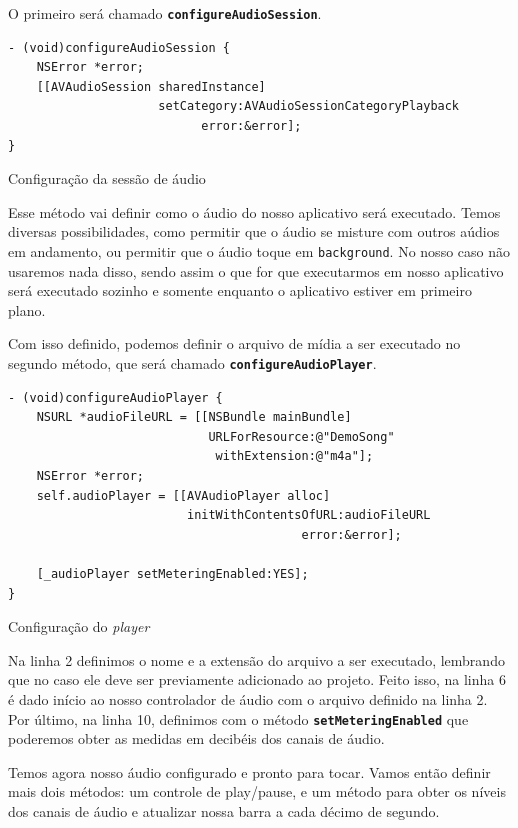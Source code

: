 \documentclass[a4paper,12pt,brazil,doubleside]{book}
\begin{document}
\begin{singlespace}
O primeiro será chamado \texttt{\textbf{configureAudioSession}}.

\begin{listing}[H]
\begin{verbatim}
- (void)configureAudioSession {
    NSError *error;
    [[AVAudioSession sharedInstance]
                     setCategory:AVAudioSessionCategoryPlayback
                           error:&error];
}
\end{verbatim}
\caption{Configuração da sessão de áudio}
\end{listing}


Esse método vai definir como o áudio do nosso aplicativo será executado. Temos diversas possibilidades, como permitir que o áudio se misture com outros aúdios em andamento, ou permitir que o áudio toque em \texttt{background}. No nosso caso não usaremos nada disso, sendo assim o que for que executarmos em nosso aplicativo será executado sozinho e somente enquanto o aplicativo estiver em primeiro plano.

Com isso definido, podemos definir o arquivo de mídia a ser executado no segundo método, que será chamado \texttt{\textbf{configureAudioPlayer}}.

\begin{listing}[H]
\begin{verbatim}
- (void)configureAudioPlayer {
    NSURL *audioFileURL = [[NSBundle mainBundle]
                            URLForResource:@"DemoSong"
                             withExtension:@"m4a"];
    NSError *error;
    self.audioPlayer = [[AVAudioPlayer alloc]
                         initWithContentsOfURL:audioFileURL
                                         error:&error];
    
    [_audioPlayer setMeteringEnabled:YES];
}
\end{verbatim}
\caption{Configuração do \emph{player}}
\end{listing}


Na linha 2 definimos o nome e a extensão do arquivo a ser executado, lembrando que no caso ele deve ser previamente adicionado ao projeto. Feito isso, na linha 6 é dado início ao nosso controlador de áudio com o arquivo definido na linha 2. Por último, na linha 10, definimos com o método \texttt{\textbf{setMeteringEnabled}} que poderemos obter as medidas em decibéis dos canais de áudio.

Temos agora nosso áudio configurado e pronto para tocar. Vamos então definir mais dois métodos: um controle de play/pause, e um método para obter os níveis dos canais de áudio e atualizar nossa barra a cada décimo de segundo.


\end{singlespace}
\end{document}
